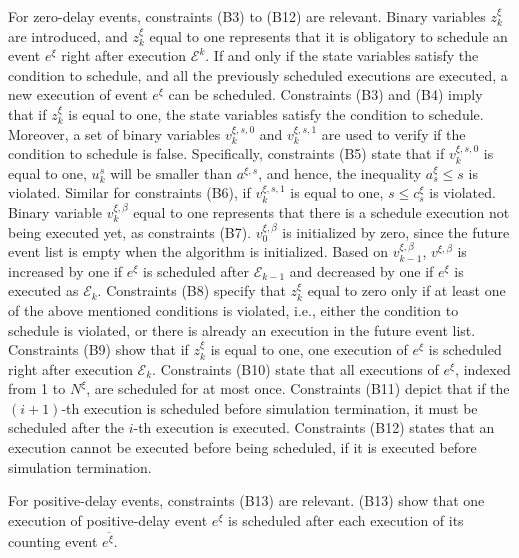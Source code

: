 \documentclass[]{interact}
\theoremstyle{plain}%
\theoremstyle{definition}
\theoremstyle{remark}
\begin{document}
For zero-delay events, constraints (B3) to (B12) are relevant. Binary variables $z^{\xi}_{k}$ are introduced, and $z^{\xi}_{k}$ equal to one represents that it is obligatory to schedule an event $e^{\xi}$ right after execution $\mathcal{E}^k$. If and only if the state variables satisfy the condition to schedule, and all the previously scheduled executions are executed, a new execution of event $e^{\xi}$ can be scheduled. Constraints (B3) and (B4) imply that if $z^{\xi}_k$ is equal to one, the state variables satisfy the condition to schedule. Moreover, a set of binary variables $v^{\xi,s,0}_k$ and $v^{\xi,s,1}_k$ are used to verify if the condition to schedule is false. Specifically, constraints (B5) state that if  $v^{\xi,s,0}_k$ is equal to one, $u^s_k$ will be smaller than $a^{\xi,s}$, and hence, the inequality $a^{\xi}_s\le s$ is violated. Similar for constraints (B6), if $v^{\xi,s,1}_k$ is equal to one, $s \le c^{\xi}_s$ is violated. %
Binary variable $v^{\xi,\beta}_k$ equal to one represents that  there is a schedule execution not being executed yet, as constraints (B7). $v^{\xi,\beta}_{0}$ is initialized by zero, since the future event list is empty when the algorithm is initialized. Based on $v^{\xi,\beta}_{k-1}$, $v^{\xi,\beta}$ is increased by one if $e^{\xi}$ is scheduled after $\mathcal{E}_{k-1}$ and decreased by one if $e^{\xi}$ is executed as $\mathcal{E}_{k}$. 
Constraints (B8) specify that $z^{\xi}_k$ equal to zero only if at least one of the above mentioned conditions is violated, i.e., either the condition to schedule is violated, or there is already an execution in the future event list. Constraints (B9) show that if $z^{\xi}_k$ is equal to one, one execution of $e^{\xi}$ is scheduled right after execution $\mathcal{E}_k$. Constraints (B10) state that all executions of $e^{\xi}$, indexed from 1 to $N^{\xi}$, are scheduled for at most once. Constraints (B11) depict that if the $(i+1)$-th execution is scheduled before simulation termination, it must be scheduled after the $i$-th execution is executed. Constraints (B12) states that an execution cannot be executed before being scheduled, if it is executed before simulation termination. 

For positive-delay events, constraints (B13) are relevant. (B13) show that one execution of positive-delay event $e^{\xi}$ is scheduled after each execution of its counting event $e^{\tilde{\xi}}$.
\end{document}
